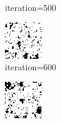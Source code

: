 \documentclass{article}
\begin{document}
\begin{figure}[h]
\begin{subfigure}[t]{0.18\textwidth}
\vspace{-0.6cm}
\caption{iteration=500}
\end{subfigure}\hspace{0.01\textwidth}
\begin{subfigure}[t]{0.18\textwidth}
\centering
\includegraphics[width=\textwidth]{./computational/results/gibbs_node_sampler_positive_iter_600.png}
\vspace{-0.6cm}
\caption{iteration=600}
\end{subfigure}\hspace{0.01\textwidth}
\begin{subfigure}[t]{0.18\textwidth}
\centering
\includegraphics[width=\textwidth]{./computational/results/gibbs_node_sampler_positive_iter_700.png}

\end{subfigure}
\end{figure}
\end{document}

